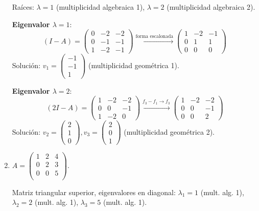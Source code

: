 \begin{prob}
\begin{enumerate}[$a)$]
\begin{myproof}
Raíces: $\lambda = 1$ (multiplicidad algebraica 1), $\lambda = 2$ (multiplicidad algebraica 2).

\textbf{Eigenvalor $\lambda=1$}:
\[
( I - A) = \begin{pmatrix}
0 & -2 & -2 \\
0 & -1 & -1 \\
1 & -2 & -1
\end{pmatrix} \xrightarrow{\text{forma escalonada}} \begin{pmatrix}
1 & -2 & -1 \\
0 & 1 & 1 \\
0 & 0 & 0
\end{pmatrix}
\]
Solución: $v_1 = \begin{pmatrix} -1 \\ -1 \\ 1 \end{pmatrix}$ (multiplicidad geométrica 1).

\textbf{Eigenvalor $\lambda=2$}:
\[
(2I - A) = \begin{pmatrix}
1 & -2 & -2 \\
0 & 0 & -1 \\
1 & -2 & 0
\end{pmatrix} \xrightarrow{f_3 - f_1 \to f_3} \begin{pmatrix}
1 & -2 & -2 \\
0 & 0 & -1 \\
0 & 0 & 2
\end{pmatrix}
\]
Solución: $v_2 = \begin{pmatrix} 2 \\ 1 \\ 0 \end{pmatrix}, v_3 = \begin{pmatrix} 2 \\ 0 \\ 1 \end{pmatrix}$ (multiplicidad geométrica 2).
\end{myproof}
	
	\item $A=\left( \begin{array}{ccc} 
	1&2&4 \\
	0&2&3\\
	0&0&5\\
	\end{array} \right).$ 
\begin{myproof}
Matriz triangular superior, eigenvalores en diagonal: 
$\lambda_1 = 1$ (mult. alg. 1), $\lambda_2 = 2$ (mult. alg. 1), $\lambda_3 = 5$ (mult. alg. 1).


\end{myproof}
\end{enumerate}
\end{prob}
